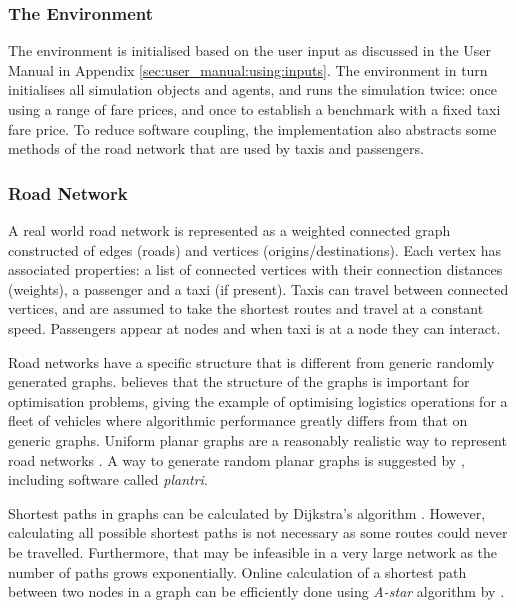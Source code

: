 \subsubsection{The Environment}
\label{sec:implementation:software:environment}

The environment is initialised based on the user input as discussed in the User
Manual in Appendix \ref{sec:user_manual:using:inputs}. The environment in turn
initialises all simulation objects and agents, and runs the simulation twice:
once using a range of fare prices, and once to establish a benchmark with a
fixed taxi fare price. To reduce software coupling, the implementation also
abstracts some methods of the road network that are used by taxis and
passengers.


\subsubsection{Road Network}
\label{sec:implementation:software:roads}

A real world road network is represented as a weighted connected graph
constructed of edges (roads) and vertices (origins/destinations). Each vertex
has associated properties: a list of connected vertices with their connection
distances (weights), a passenger and a taxi (if present). Taxis can travel
between connected vertices, and are assumed to take the shortest routes and
travel at a constant speed. Passengers appear at nodes and when taxi is at a
node  they can interact.

Road networks have a specific structure that is different from generic randomly
generated graphs. \textcite{Eisenstat2011graphs+quadtree} believes that the
structure of the graphs is important for optimisation problems, giving the
example of optimising logistics operations for a fleet of vehicles where
algorithmic performance greatly differs from that on generic graphs. Uniform
planar graphs are a reasonably realistic way to represent road networks
\parencite{Eisenstat2011graphs+quadtree, Masucci2009graphs+london}. A way to
generate random planar graphs is suggested by
\textcite{Brinkmann2007graphs+generate}, including software called
\textit{plantri}.

Shortest paths in graphs can be calculated by Dijkstra's algorithm
\parencite{Cormen2009algorithms}. However, calculating all possible shortest
paths is not necessary as some routes could never be travelled. Furthermore,
that may be infeasible in a very large network as the number of paths grows
exponentially. Online calculation of a shortest path between two nodes in a
graph can be efficiently done using \textit{A-star} algorithm by
\textcite{Hart1968paths}.

